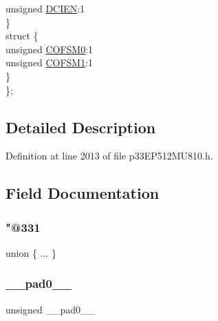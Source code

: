 \begin{DoxyCompactItemize}
\begin{tabbing}
\>\>unsigned \hyperlink{structtag_d_c_i_c_o_n1_b_i_t_s_a7530f61d732a3b8e44b2e0a96b80b026}{DCIEN}:1\\
\>\} \\
\>struct \{\\
\>\>unsigned \hyperlink{structtag_d_c_i_c_o_n1_b_i_t_s_abd4db9b2fa78b143748809a4ca56e540}{COFSM0}:1\\
\>\>unsigned \hyperlink{structtag_d_c_i_c_o_n1_b_i_t_s_a936693ee63d914cb3854c55f739120e6}{COFSM1}:1\\
\>\} \\
\}; \\

\end{tabbing}\end{DoxyCompactItemize}


\subsection{Detailed Description}


Definition at line 2013 of file p33\+E\+P512\+M\+U810.\+h.



\subsection{Field Documentation}
\mbox{\label{structtag_d_c_i_c_o_n1_b_i_t_s_a49f4251062f12cf65dbfd1218f236b7a}} 
\subsubsection{\texorpdfstring{"@331}{@331}}
{\footnotesize\ttfamily union \{ ... \} }

\mbox{\label{structtag_d_c_i_c_o_n1_b_i_t_s_adf71f3d8410c1f1dbbc96680a92c49af}} 
\subsubsection{\texorpdfstring{\+\_\+\+\_\+pad0\+\_\+\+\_\+}{\_\_pad0\_\_}}
{\footnotesize\ttfamily unsigned \+\_\+\+\_\+pad0\+\_\+\+\_\+}



